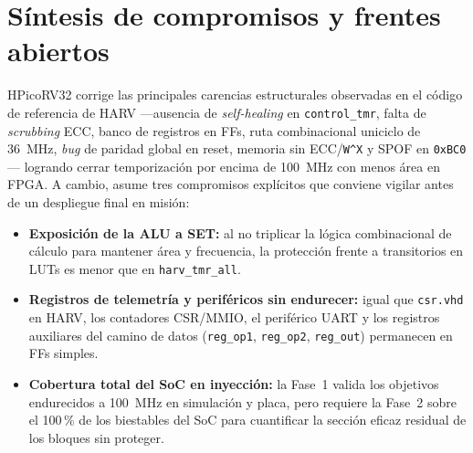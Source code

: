 \documentclass[a4paper,10pt]{article}
\begin{document}
\section{Síntesis de compromisos y frentes abiertos}

HPicoRV32 corrige las principales carencias estructurales observadas en el código de referencia de HARV —ausencia de \textit{self-healing} en \texttt{control\_tmr}, falta de \textit{scrubbing} ECC, banco de registros en FFs, ruta combinacional uniciclo de 36~MHz, \textit{bug} de paridad global en reset, memoria sin ECC/\texttt{W\^{}X} y SPOF en \texttt{0xBC0}— logrando cerrar temporización por encima de 100~MHz con menos área en FPGA. A cambio, asume tres compromisos explícitos que conviene vigilar antes de un despliegue final en misión:
\begin{itemize}
  \item \textbf{Exposición de la ALU a SET:} al no triplicar la lógica combinacional de cálculo para mantener área y frecuencia, la protección frente a transitorios en LUTs es menor que en \texttt{harv\_tmr\_all}.
  \item \textbf{Registros de telemetría y periféricos sin endurecer:} igual que \texttt{csr.vhd} en HARV, los contadores CSR/MMIO, el periférico UART y los registros auxiliares del camino de datos (\texttt{reg\_op1}, \texttt{reg\_op2}, \texttt{reg\_out}) permanecen en FFs simples.
  \item \textbf{Cobertura total del SoC en inyección:} la Fase~1 valida los objetivos endurecidos a 100~MHz en simulación y placa, pero requiere la Fase~2 sobre el 100\,\% de los biestables del SoC para cuantificar la sección eficaz residual de los bloques sin proteger.
\end{itemize}


\small

\end{document}
